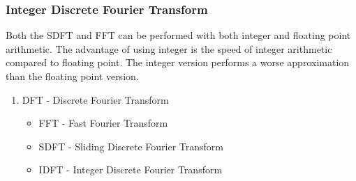 \subsubsection{Integer Discrete Fourier Transform}
Both the SDFT and FFT can be performed with both
integer and floating point arithmetic. The advantage
of using integer is the speed of integer arithmetic compared to floating point.
The integer version performs a worse approximation than the floating point
version. 

\begin{enumerate}
\item DFT - Discrete Fourier Transform
	\begin{itemize}
	  \item FFT - Fast Fourier Transform
		\item SDFT - Sliding Discrete Fourier Transform
		\item IDFT - Integer Discrete Fourier Transform
	\end{itemize}
\end{enumerate}